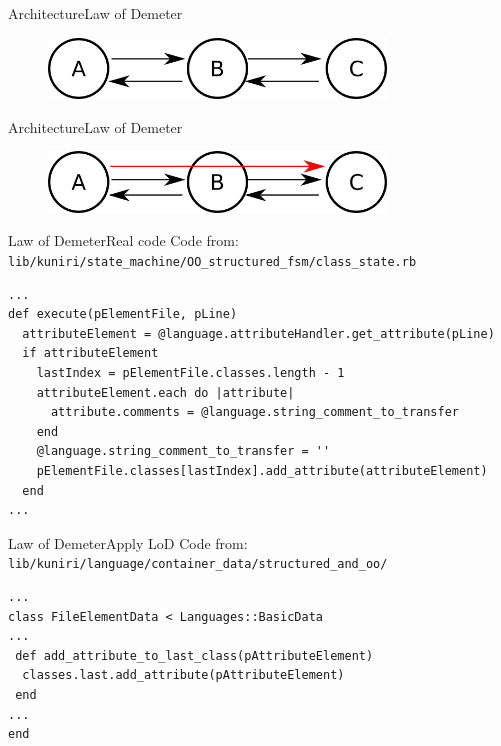 \documentclass[10pt]{beamer}
\begin{document}
\begin{frame}{Architecture}{Law of Demeter}
  \begin{figure}[Look at class structure]
    \includegraphics[width=0.8\textwidth]{images/demeter_2.png}
  \end{figure}
\end{frame}

\begin{frame}{Architecture}{Law of Demeter}
  \begin{figure}[Look at class structure]
    \includegraphics[width=0.8\textwidth]{images/demeter_3.png}
  \end{figure}
\end{frame}


\begin{frame}[fragile]{Law of Demeter}{Real code}
Code from:
\verb|lib/kuniri/state_machine/OO_structured_fsm/class_state.rb|
\small
\begin{lstlisting}
...
def execute(pElementFile, pLine)
  attributeElement = @language.attributeHandler.get_attribute(pLine)
  if attributeElement
    lastIndex = pElementFile.classes.length - 1
    attributeElement.each do |attribute|
      attribute.comments = @language.string_comment_to_transfer
    end
    @language.string_comment_to_transfer = ''
    pElementFile.classes[lastIndex].add_attribute(attributeElement)
  end
...
\end{lstlisting}
\end{frame}

\begin{frame}[fragile]{Law of Demeter}{Apply LoD}
Code from:
\verb|lib/kuniri/language/container_data/structured_and_oo/|
\small
\begin{lstlisting}
...
class FileElementData < Languages::BasicData
...
 def add_attribute_to_last_class(pAttributeElement)
  classes.last.add_attribute(pAttributeElement)
 end
...
end
\end{lstlisting}
\end{frame}
\end{document}

